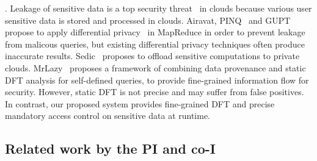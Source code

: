 . Leakage of sensitive data is a top security 
threat~\cite{top-threats-nine, kazim2015survey} in clouds because various user 
sensitive data is stored and processed in clouds. 
Airavat\cite{airavat:nsdi10}, PINQ~\cite{pinq:sigmod09} and 
GUPT~\cite{gupt:sigmod12} propose to apply differential 
privacy~\cite{noise:tcc06} in MapReduce in order to prevent leakage from 
malicous queries, but existing differential privacy techniques often produce
inaccurate results. Sedic~\cite{sedic:cloud13} proposes to offload sensitive 
computations to private clouds. MrLazy~\cite{hotcloud14:mrlazy}
proposes a framework of combining data provenance and static DFT analysis for 
self-defined queries, to provide fine-grained information flow for security. 
However, static DFT is not precise and may suffer from false positives. 
In contrast, our proposed \kakute system provides fine-grained DFT and precise
mandatory access control on sensitive data at runtime.



\vspace{-.15in}\subsection{Related work by the PI and co-I} 
\label{sec:my-work}\vspace{-.075in}
% 


